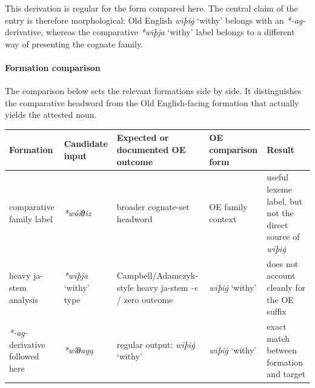 \documentclass[
  british,
  a4paper,
]{article}
\newcounter{none} %
\providecommand{\Recon}[1]{\emph{*#1}}
\begin{document}
This derivation is regular for the form compared here. The central claim
of the entry is therefore morphological: Old English \emph{wīþiġ}
`withy' belongs with an \emph{*-ag-} derivative, whereas the comparative
\Recon{wīþja} `withy' label belongs to a different way of presenting the
cognate family.

\paragraph{Formation comparison}\label{formation-comparison-8}

The comparison below sets the relevant formations side by side. It
distinguishes the comparative headword from the Old English-facing
formation that actually yields the attested noun.

{\def\LTcaptype{none} %
\begin{longtable}[]{@{}
  >{\raggedright\arraybackslash}p{}
  >{\raggedright\arraybackslash}p{}
  >{\raggedright\arraybackslash}p{}
  >{\raggedright\arraybackslash}p{}
  >{\raggedright\arraybackslash}p{}@{}}
\toprule\noalign{}
\begin{minipage}[b]{\linewidth}\raggedright
Formation
\end{minipage} & \begin{minipage}[b]{\linewidth}\raggedright
Candidate input
\end{minipage} & \begin{minipage}[b]{\linewidth}\raggedright
Expected or documented OE outcome
\end{minipage} & \begin{minipage}[b]{\linewidth}\raggedright
OE comparison form
\end{minipage} & \begin{minipage}[b]{\linewidth}\raggedright
Result
\end{minipage} \\
\midrule\noalign{}
\endhead
\bottomrule\noalign{}
\endlastfoot
comparative family label & {\emph{*wáiθiz}} & broader cognate-set
headword & OE family context & useful lexeme label, but not the direct
source of \emph{wīþiġ} \\
heavy ja-stem analysis & \Recon{wīþja} `withy' type &
Campbell/Adamczyk-style heavy ja-stem \emph{-e} / zero outcome &
{\emph{wīþiġ}} `withy' & does not account cleanly for the OE suffix \\
\emph{*-ag-} derivative followed here & {\emph{*wī́θagą}} & regular
output: {\emph{wīþiġ}} `withy' & {\emph{wīþiġ}} `withy' & exact match
between formation and target \\
\end{longtable}
}
\end{document}
